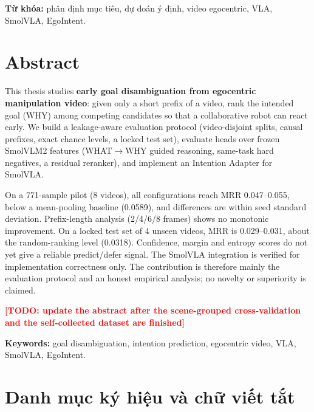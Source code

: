 \documentclass[12pt,a4paper]{report}
\newcommand{\TODO}[1]{\textcolor{red}{\textbf{[TODO: #1]}}}
\begin{document}
\textbf{Từ khóa:} phân định mục tiêu, dự đoán ý định, video egocentric, VLA, SmolVLA, EgoIntent.

\chapter*{Abstract}

This thesis studies \textbf{early goal disambiguation from egocentric manipulation video}: given only a short prefix of a video, rank the intended goal (WHY) among competing candidates so that a collaborative robot can react early. We build a leakage-aware evaluation protocol (video-disjoint splits, causal prefixes, exact chance levels, a locked test set), evaluate heads over frozen SmolVLM2 features (WHAT$\to$WHY guided reasoning, same-task hard negatives, a residual reranker), and implement an Intention Adapter for SmolVLA.

On a 771-sample pilot (8 videos), all configurations reach MRR 0.047--0.055, below a mean-pooling baseline (0.0589), and differences are within seed standard deviation. Prefix-length analysis (2/4/6/8 frames) shows no monotonic improvement. On a locked test set of 4 unseen videos, MRR is 0.029--0.031, about the random-ranking level (0.0318). Confidence, margin and entropy scores do not yet give a reliable predict/defer signal. The SmolVLA integration is verified for implementation correctness only. The contribution is therefore mainly the evaluation protocol and an honest empirical analysis; no novelty or superiority is claimed.

\TODO{update the abstract after the scene-grouped cross-validation and the self-collected dataset are finished}

\textbf{Keywords:} goal disambiguation, intention prediction, egocentric video, VLA, SmolVLA, EgoIntent.

\tableofcontents
\listoftables
\listoffigures

\chapter*{Danh mục ký hiệu và chữ viết tắt}
\end{document}
